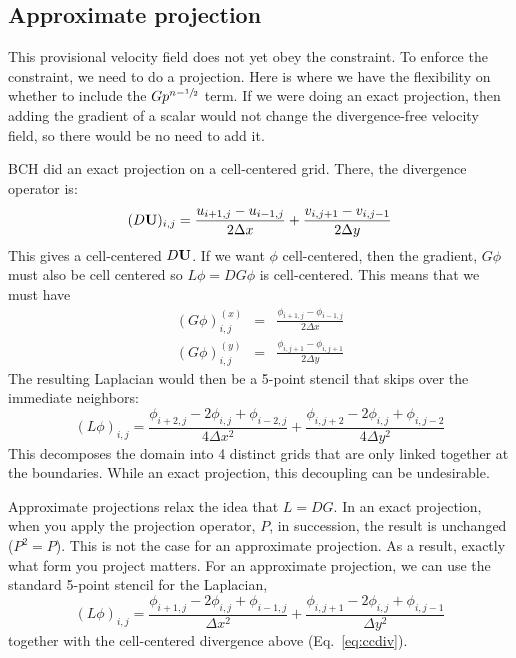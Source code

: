 \subsection{Approximate projection}

This provisional velocity field does not yet obey the constraint.  To
enforce the constraint, we need to do a projection.  Here is where we
have the flexibility on whether to include the $G p^{n-{\sfrac{1}{2}}}$ term.  If
we were doing an exact projection, then adding the gradient of a
scalar would not change the divergence-free velocity field, so there
would be no need to add it.  

BCH did an exact projection on a cell-centered grid.  There, the
divergence operator is:
\begin{equation}
(D {\bf U})_{i,j} = \frac{u_{i+1,j} - u_{i-1,j}}{2\Delta x} +
              \frac{v_{i,j+1} - v_{i,j-1}}{2\Delta y} \label{eq:ccdiv}
\end{equation}
This gives a cell-centered $D{\bf U}$.  If we want $\phi$ cell-centered, then
the gradient, $G\phi$ must also be cell centered so $L\phi = DG\phi$ is 
cell-centered.  This means that we must have
\begin{eqnarray}
(G\phi)^{(x)}_{i,j} &=& \frac{\phi_{i+1,j} - \phi_{i-1,j}}{2\Delta x} \\
(G\phi)^{(y)}_{i,j} &=& \frac{\phi_{i,j+1} - \phi_{i,j+1}}{2\Delta y}
\end{eqnarray}
The resulting Laplacian would then be a 5-point stencil that skips over
the immediate neighbors:
\begin{equation}
(L\phi)_{i,j} = \frac{\phi_{i+2,j} -2\phi_{i,j} + \phi_{i-2,j}}{4 \Delta x^2} +
    \frac{\phi_{i,j+2} -2\phi_{i,j} + \phi_{i,j-2}}{4 \Delta y^2}
\end{equation}
This decomposes the domain into 4 distinct grids that are only linked 
together at the boundaries.  While an exact projection, this decoupling
can be undesirable.

Approximate projections relax the idea that $L = DG$.  In an exact
projection, when you apply the projection operator, $P$, in
succession, the result is unchanged ($P^2 = P$).  This is not the case
for an approximate projection.  As a result, exactly what form you
project matters.  For an approximate projection, we can use the 
standard 5-point stencil for the Laplacian,
\begin{equation}
(L\phi)_{i,j} = \frac{\phi_{i+1,j} -2\phi_{i,j} + \phi_{i-1,j}}{\Delta x^2} +
    \frac{\phi_{i,j+1} -2\phi_{i,j} + \phi_{i,j-1}}{\Delta y^2}
\end{equation}
together with the cell-centered divergence above (Eq.~\ref{eq:ccdiv}).


